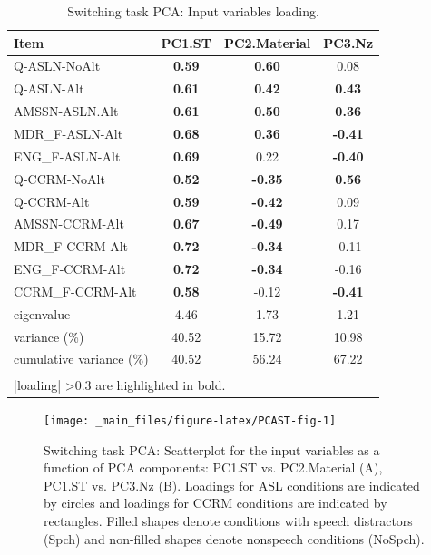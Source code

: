 \documentclass[a4paper, twoside]{templates/ociamthesis}
\begin{document}
\begin{table}

\caption{\label{tab:PCAST-Tab}Switching task PCA: Input variables loading.}
\centering
\begin{tabular}[t]{lccc}
\toprule
Item & PC1.ST & PC2.Material & PC3.Nz\\
\midrule
Q-ASLN-NoAlt & \textbf{0.59} & \textbf{0.60} & 0.08\\
Q-ASLN-Alt & \textbf{0.61} & \textbf{0.42} & \textbf{0.43}\\
AMSSN-ASLN.Alt & \textbf{0.61} & \textbf{0.50} & \textbf{0.36}\\
MDR\_F-ASLN-Alt & \textbf{0.68} & \textbf{0.36} & \textbf{-0.41}\\
ENG\_F-ASLN-Alt & \textbf{0.69} & 0.22 & \textbf{-0.40}\\
Q-CCRM-NoAlt & \textbf{0.52} & \textbf{-0.35} & \textbf{0.56}\\
Q-CCRM-Alt & \textbf{0.59} & \textbf{-0.42} & 0.09\\
AMSSN-CCRM-Alt & \textbf{0.67} & \textbf{-0.49} & 0.17\\
MDR\_F-CCRM-Alt & \textbf{0.72} & \textbf{-0.34} & -0.11\\
ENG\_F-CCRM-Alt & \textbf{0.72} & \textbf{-0.34} & -0.16\\
CCRM\_F-CCRM-Alt & \textbf{0.58} & -0.12 & \textbf{-0.41}\\
\midrule
eigenvalue & 4.46 & 1.73 & 1.21\\
variance (\%) & 40.52 & 15.72 & 10.98\\
cumulative variance (\%) & 40.52 & 56.24 & 67.22\\
\bottomrule
\multicolumn{4}{l}{\textsuperscript{} |loading| >0.3 are highlighted in bold.}\\
\end{tabular}
\end{table}

\begin{figure}

{\centering \texttt{[image: \_main\_files/figure-latex/PCAST-fig-1]} 

}

\caption{Switching task PCA: Scatterplot for the input variables as a function of PCA components: PC1.ST vs. PC2.Material (A), PC1.ST vs. PC3.Nz (B). Loadings for ASL conditions are indicated by circles and loadings for CCRM conditions are indicated by rectangles. Filled shapes denote conditions with speech distractors (Spch) and non-filled shapes denote nonspeech conditions (NoSpch).}\label{fig:PCAST-fig}
\end{figure}
\end{document}

